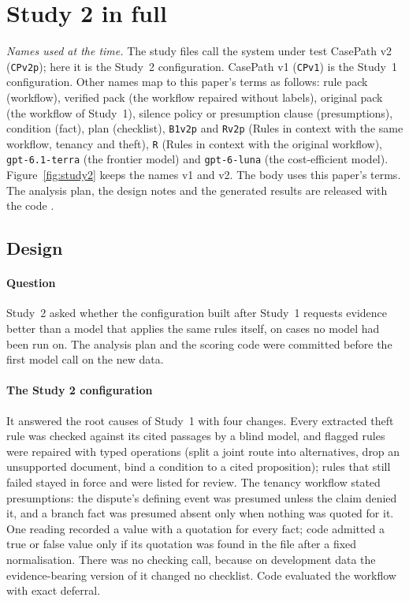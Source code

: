 \section{Study 2 in full}
\label{app:study2}

\emph{Names used at the time.} The study files call the system under test CasePath v2 (\texttt{CPv2p}); here it is the Study~2 configuration. CasePath v1 (\texttt{CPv1}) is the Study~1 configuration. Other names map to this paper's terms as follows: rule pack (workflow), verified pack (the workflow repaired without labels), original pack (the workflow of Study~1), silence policy or presumption clause (presumptions), condition (fact), plan (checklist), \texttt{B1v2p} and \texttt{Rv2p} (Rules in context with the same workflow, tenancy and theft), \texttt{R} (Rules in context with the original workflow), \texttt{gpt-6.1-terra} (the frontier model) and \texttt{gpt-6-luna} (the cost-efficient model). Figure~\ref{fig:study2} keeps the names v1 and v2. The body uses this paper's terms. The analysis plan, the design notes and the generated results are released with the code \cite{casepath2026repo}.

\subsection{Design}
\label{app:s2-design}

\paragraph{Question}
Study~2 asked whether the configuration built after Study~1 requests evidence better than a model that applies the same rules itself, on cases no model had been run on. The analysis plan and the scoring code were committed before the first model call on the new data.

\paragraph{The Study 2 configuration}
It answered the root causes of Study~1 with four changes. Every extracted theft rule was checked against its cited passages by a blind model, and flagged rules were repaired with typed operations (split a joint route into alternatives, drop an unsupported document, bind a condition to a cited proposition); rules that still failed stayed in force and were listed for review. The tenancy workflow stated presumptions: the dispute's defining event was presumed unless the claim denied it, and a branch fact was presumed absent only when nothing was quoted for it. One reading recorded a value with a quotation for every fact; code admitted a true or false value only if its quotation was found in the file after a fixed normalisation. There was no checking call, because on development data the evidence-bearing version of it changed no checklist. Code evaluated the workflow with exact deferral.

